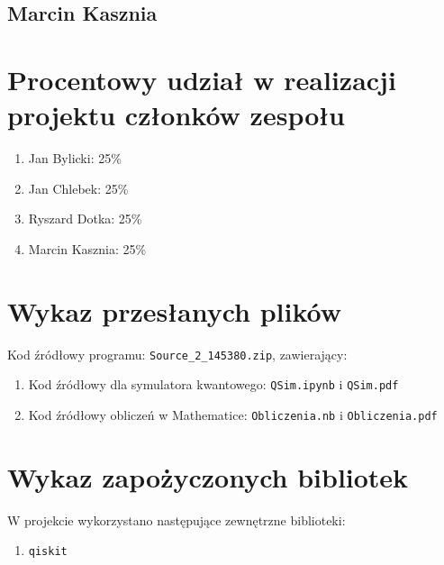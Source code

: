 \documentclass{article}
\begin{document}
    \subsection{Marcin Kasznia}

\section{Procentowy udział w realizacji projektu członków zespołu}
\begin{enumerate}
    \item Jan Bylicki: 25\%
    \item Jan Chlebek: 25\%
    \item Ryszard Dotka: 25\%
    \item Marcin Kasznia: 25\%
\end{enumerate}
\section{Wykaz przesłanych plików}
    Kod źródłowy programu: \verb+Source_2_145380.zip+, zawierający:
    \begin{enumerate}
        \item Kod źródłowy dla symulatora kwantowego: \verb+QSim.ipynb+ i \verb+QSim.pdf+
        \item Kod źródłowy obliczeń w Mathematice: \verb+Obliczenia.nb+ i \verb+Obliczenia.pdf+
        
    \end{enumerate}
\section{Wykaz zapożyczonych bibliotek}
W projekcie wykorzystano następujące zewnętrzne biblioteki:
    \begin{enumerate}
        \item \verb+qiskit+
    \end{enumerate}
\end{document}
